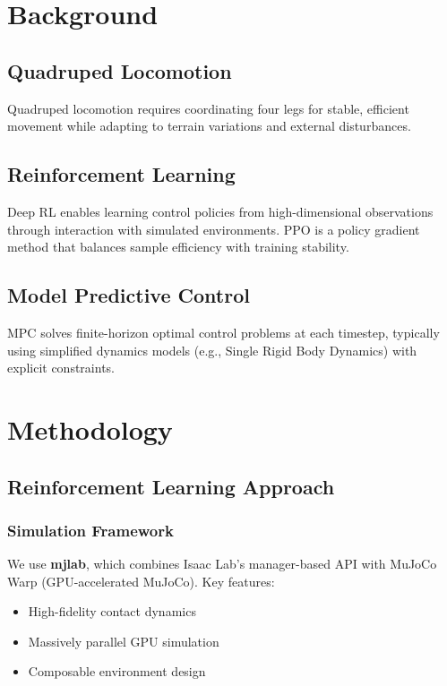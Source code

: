 \documentclass[12pt,a4paper]{article}
\begin{document}
\section{Background}

\subsection{Quadruped Locomotion}
Quadruped locomotion requires coordinating four legs for stable, efficient movement while adapting to terrain variations and external disturbances.

\subsection{Reinforcement Learning}
Deep RL enables learning control policies from high-dimensional observations through interaction with simulated environments. PPO is a policy gradient method that balances sample efficiency with training stability.

\subsection{Model Predictive Control}
MPC solves finite-horizon optimal control problems at each timestep, typically using simplified dynamics models (e.g., Single Rigid Body Dynamics) with explicit constraints.

\section{Methodology}

\subsection{Reinforcement Learning Approach}

\subsubsection{Simulation Framework}

We use \textbf{mjlab}, which combines Isaac Lab's manager-based API with MuJoCo Warp (GPU-accelerated MuJoCo). Key features:
\begin{itemize}
    \item High-fidelity contact dynamics
    \item Massively parallel GPU simulation
    \item Composable environment design
\end{itemize}
\end{document}
